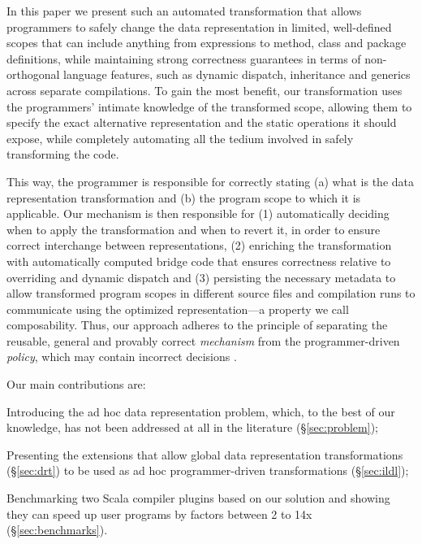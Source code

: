 In this paper we present such an automated transformation that allows
programmers to safely change the data representation in limited,
well-defined scopes that can include anything from expressions to
method, class and package definitions, while maintaining strong
correctness guarantees in terms of non-orthogonal language features,
such as dynamic dispatch, inheritance and generics across separate
compilations.
To gain the most benefit, our transformation uses the programmers'
intimate knowledge of the transformed scope, allowing them to specify
the exact alternative representation and the static operations it
should expose, while completely automating all the tedium involved in
safely transforming the code.

This way, the programmer is responsible for correctly stating (a)
what is the data representation transformation and (b) the program
scope to which it is applicable. Our mechanism is then
responsible for (1) automatically deciding when to apply the
transformation and when to revert it, in order to ensure correct
interchange between representations, (2) enriching the transformation
with automatically computed bridge code that ensures correctness
relative to overriding and dynamic dispatch and (3) persisting
the necessary metadata to allow transformed program scopes in
different source files and compilation runs to communicate using
the optimized representation---a property we call composability.
Thus, our approach adheres to the principle of separating the
reusable, general and provably correct \emph{mechanism} from the
programmer-driven \emph{policy}, which may contain incorrect
decisions \cite{lampson-mechanism-policy}.

Our main contributions are:
\begin{compactitem}
  \item Introducing the ad hoc data representation problem, which, to the
    best of our knowledge, has not been addressed at all in the
    literature (\S\ref{sec:problem});
  \item Presenting the extensions that allow global data
    representation transformations (\S\ref{sec:drt}) to be used as
    ad hoc programmer-driven transformations (\S\ref{sec:ildl});
  \item Benchmarking two Scala compiler plugins based on our solution
    and showing they can speed up user programs by factors between 2
    to 14x (\S\ref{sec:benchmarks}).
\end{compactitem}

